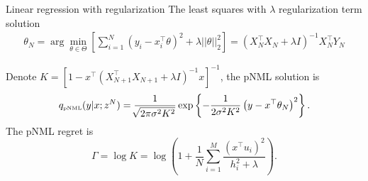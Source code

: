 \documentclass[aspectratio=169]{beamer}
\begin{document}
\begin{frame}{Linear regression with regularization}
The least squares with $\lambda$ regularization term  solution 
    \begin{align}
    \theta_N = \arg\min_{\theta\in\Theta} \left[ \sum_{i=1}^N \left(y_i - x_i^\top \theta \right)^2 + \lambda ||\theta||_2^2 \right] = (X_N^\top X_N + \lambda I)^{-1} X_N^\top Y_N
    \end{align}
\pause
\begin{theorem}
Denote  $K = \left[1 - x^\top (X_{N+1}^\top X_{N+1} + \lambda I)^{-1} x \right]^{-1}$, the pNML solution is
\begin{equation}
    q_{\mbox{\tiny{pNML}}}(y | x; z^N) = \frac{1}{\sqrt[]{2\pi\sigma^2 K^2}}\exp\left\{-\frac{1}{2\sigma^2 K^2}\left(y-x^\top \theta_N \right)^2\right\}.
\end{equation}
The pNML regret is
\begin{equation}
    \Gamma = \log K = \log \left(1 + \frac{1}{N} \sum_{i=1}^{M} \frac{\left(x^\top u_i\right)^2 }{h_i^2 + \lambda}\right).
\end{equation}
\end{theorem}

\end{frame}
\end{document}
